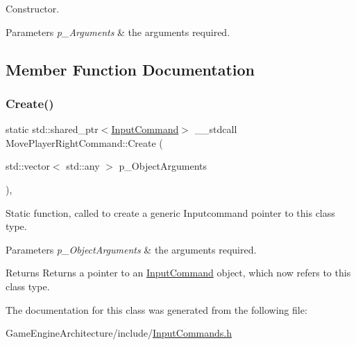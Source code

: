 Constructor. 


\begin{DoxyParams}{Parameters}
{\em p\+\_\+\+Arguments} & the arguments required. \\
\hline
\end{DoxyParams}


\subsection{Member Function Documentation}
\mbox{\label{class_move_player_right_command_a7f1db350bd0e0584b1857fb247f80522}} 
\subsubsection{\texorpdfstring{Create()}{Create()}}
{\footnotesize\ttfamily static std\+::shared\+\_\+ptr$<$\mbox{\hyperlink{class_input_command}{Input\+Command}}$>$ \+\_\+\+\_\+stdcall Move\+Player\+Right\+Command\+::\+Create (\begin{DoxyParamCaption}\item[{std\+::vector$<$ std\+::any $>$}]{p\+\_\+\+Object\+Arguments }\end{DoxyParamCaption})\hspace{0.3cm}{\ttfamily [inline]}, {\ttfamily [static]}}



Static function, called to create a generic Inputcommand pointer to this class type. 


\begin{DoxyParams}{Parameters}
{\em p\+\_\+\+Object\+Arguments} & the arguments required. \\
\hline
\end{DoxyParams}
\begin{DoxyReturn}{Returns}
Returns a pointer to an \mbox{\hyperlink{class_input_command}{Input\+Command}} object, which now refers to this class type. 
\end{DoxyReturn}


The documentation for this class was generated from the following file\+:\begin{DoxyCompactItemize}
\item 
Game\+Engine\+Architecture/include/\mbox{\hyperlink{_input_commands_8h}{Input\+Commands.\+h}}\end{DoxyCompactItemize}
